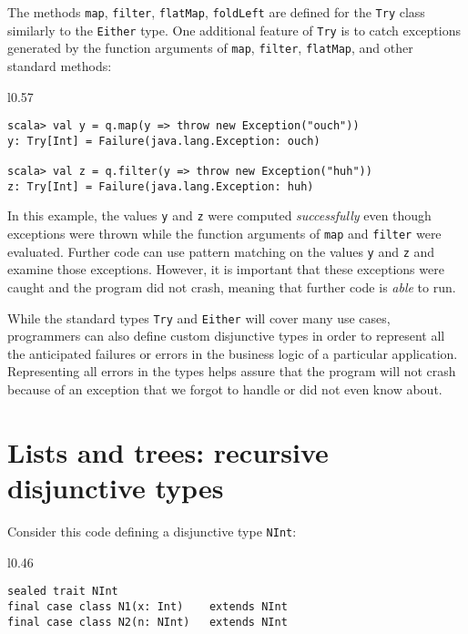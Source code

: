 The methods \lstinline!map!, \lstinline!filter!, \lstinline!flatMap!,
\lstinline!foldLeft! are defined for the \lstinline!Try! class similarly
to the \lstinline!Either! type. One additional feature of \lstinline!Try!
is to catch exceptions generated by the function arguments of \lstinline!map!,
\lstinline!filter!, \lstinline!flatMap!, and other standard methods:

\begin{wrapfigure}{l}{0.57\columnwidth}%
\vspace{-0.9\baselineskip}

\begin{lstlisting}
scala> val y = q.map(y => throw new Exception("ouch"))
y: Try[Int] = Failure(java.lang.Exception: ouch)

scala> val z = q.filter(y => throw new Exception("huh"))
z: Try[Int] = Failure(java.lang.Exception: huh)
\end{lstlisting}
\vspace{-0.9\baselineskip}
\end{wrapfigure}%

\noindent In this example, the values \lstinline!y! and \lstinline!z!
were computed \emph{successfully} even though exceptions were thrown
while the function arguments of \lstinline!map! and \lstinline!filter!
were evaluated. Further code can use pattern matching on the values
\lstinline!y! and \lstinline!z! and examine those exceptions. However,
it is important that these exceptions were caught and the program
did not crash, meaning that further code is \emph{able} to run. 

While the standard types \lstinline!Try! and \lstinline!Either!
will cover many use cases, programmers can also define custom disjunctive
types in order to represent all the anticipated failures or errors
in the business logic of a particular application. Representing all
errors in the types helps assure that the program will not crash because
of an exception that we forgot to handle or did not even know about.

\section{Lists and trees: recursive disjunctive types\label{sec:Lists-and-trees:recursive-disjunctive-types}}

Consider this code defining a disjunctive type \lstinline!NInt!:

\begin{wrapfigure}{l}{0.46\columnwidth}%
\vspace{-0.75\baselineskip}

\begin{lstlisting}
sealed trait NInt
final case class N1(x: Int)    extends NInt
final case class N2(n: NInt)   extends NInt
\end{lstlisting}
\vspace{-0.75\baselineskip}
\end{wrapfigure}%

